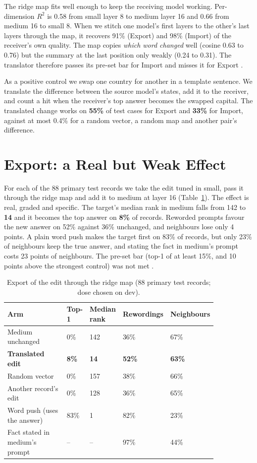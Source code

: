 The ridge map fits well enough to keep the receiving model working. Per-dimension $R^2$ is 0.58 from small layer 8 to medium layer 16 and 0.66 from medium 16 to small 8. When we stitch one model's first layers to the other's last layers through the map, it recovers 91\% (Export) and 98\% (Import) of the receiver's own quality. The map copies \emph{which word changed} well (cosine 0.63 to 0.76) but the summary at the last position only weakly (0.24 to 0.31). The translator therefore passes its pre-set bar for Import and misses it for Export \cite{p16}.

As a positive control we swap one country for another in a template sentence. We translate the difference between the source model's states, add it to the receiver, and count a hit when the receiver's top answer becomes the swapped capital. The translated change works on \textbf{55\%} of test cases for Export and \textbf{33\%} for Import, against at most 0.4\% for a random vector, a random map and another pair's difference.

\section{Export: a Real but Weak Effect}\label{sec:export}

For each of the 88 primary test records we take the edit tuned in small, pass it through the ridge map and add it to medium at layer 16 (Table~\ref{tab:export}). The effect is real, graded and specific. The target's median rank in medium falls from 142 to \textbf{14} and it becomes the top answer on \textbf{8\%} of records. Reworded prompts favour the new answer on 52\% against 36\% unchanged, and neighbours lose only 4 points. A plain word push makes the target first on 83\% of records, but only 23\% of neighbours keep the true answer, and stating the fact in medium's prompt costs 23 points of neighbours. The pre-set bar (top-1 of at least 15\%, and 10 points above the strongest control) was not met \cite{p16}.

\begin{table}[t]
\centering\small
\caption{Export of the edit through the ridge map (88 primary test records; dose chosen on dev).}\label{tab:export}
\begin{tabular}{|p{0.38\linewidth}|p{0.10\linewidth}|p{0.12\linewidth}|p{0.12\linewidth}|p{0.12\linewidth}|}
\hline
\textbf{Arm} & \textbf{Top-1} & \textbf{Median rank} & \textbf{Rewordings} & \textbf{Neighbours}\\ \hline
Medium unchanged & 0\% & 142 & 36\% & 67\%\\ \hline
\textbf{Translated edit} & \textbf{8\%} & \textbf{14} & \textbf{52\%} & \textbf{63\%}\\ \hline
Random vector & 0\% & 157 & 38\% & 66\%\\ \hline
Another record's edit & 0\% & 128 & 36\% & 65\%\\ \hline
Word push (uses the answer) & 83\% & 1 & 82\% & 23\%\\ \hline
Fact stated in medium's prompt & -- & -- & 97\% & 44\%\\ \hline
\end{tabular}
\end{table}

